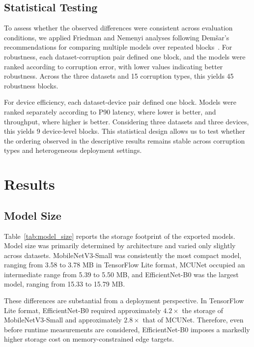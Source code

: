 \documentclass[runningheads]{llncs}
\begin{document}
\subsection{Statistical Testing}
To assess whether the observed differences were consistent across evaluation
conditions, we applied Friedman and Nemenyi analyses following Dem\v{s}ar's
recommendations for comparing multiple models over repeated
blocks~\cite{demsar2006statistical}. For robustness, each dataset-corruption
pair defined one block, and the models were ranked according to corruption
error, with lower values indicating better robustness. Across the three
datasets and 15 corruption types, this yields 45 robustness blocks.

For device efficiency, each dataset-device pair defined one block. Models were
ranked separately according to P90 latency, where lower is better, and
throughput, where higher is better. Considering three datasets and three
devices, this yields 9 device-level blocks. This statistical design allows us
to test whether the ordering observed in the descriptive results remains stable
across corruption types and heterogeneous deployment settings.

\section{Results}
\label{sec:results}

\subsection{Model Size}
Table~\ref{tab:model_size} reports the storage footprint of the exported models. Model size was primarily determined by architecture and varied only slightly across datasets. MobileNetV3-Small was consistently the most compact model, ranging from 3.58 to 3.78 MB in TensorFlow Lite format, MCUNet occupied an intermediate range from 5.39 to 5.50 MB, and EfficientNet-B0 was the largest model, ranging from 15.33 to 15.79 MB.

These differences are substantial from a deployment perspective. In TensorFlow Lite format, EfficientNet-B0 required approximately $4.2\times$ the storage of MobileNetV3-Small and approximately $2.8\times$ that of MCUNet. Therefore, even before runtime measurements are considered, EfficientNet-B0 imposes a markedly higher storage cost on memory-constrained edge targets.
\end{document}
